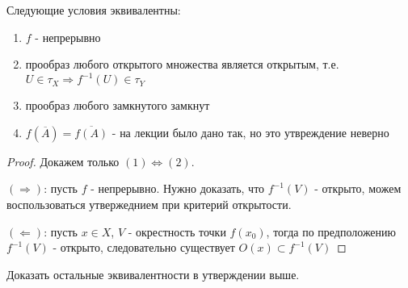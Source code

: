 \begin{statement}
    Следующие условия эквивалентны:
    \begin{enumerate}
        \item $f$ - непрерывно
        \item прообраз любого открытого множества является открытым, т.е. $U \in \tau_{X} \Rightarrow f^{-1}(U) \in \tau_{Y}$
        \item прообраз любого замкнутого замкнут
        \item $f(\overline{A}) = \overline{f(A)}$ - на лекции было дано так, но это утвреждение неверно
    \end{enumerate}
\end{statement}
\begin{proof}
    Докажем только $(1) \Leftrightarrow (2)$.

    $(\Rightarrow)$: пусть $f$ - непрерывно. Нужно доказать, что $f^{-1}(V)$ - открыто, можем воспользоваться утвержеднием при критерий открытости.


    $(\Leftarrow)$: пусть $x \in X$, $V$ - окрестность точки $f(x_0)$, тогда по предположению $f^{-1}(V)$ - открыто, следовательно существует $O(x) \subset f^{-1}(V)$
\end{proof}

\begin{exercise}
    Доказать остальные эквивалентности в утверждении выше.
\end{exercise}
